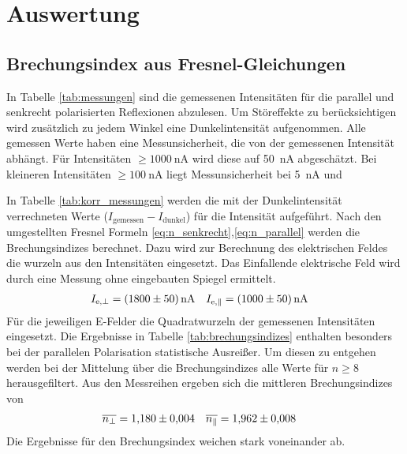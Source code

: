 \section{Auswertung}

\subsection{Brechungsindex aus Fresnel-Gleichungen}



In Tabelle \ref{tab:messungen} sind die gemessenen Intensitäten für die parallel 
und senkrecht polarisierten Reflexionen abzulesen.
Um Störeffekte zu berücksichtigen wird zusätzlich zu jedem Winkel eine Dunkelintensität aufgenommen.
Alle gemessen Werte haben eine Messunsicherheit, die von der gemessenen Intensität abhängt.
Für Intensitäten $\geq \qty{1000}{\nano\ampere}$ wird diese auf \qty{50}{\nano\ampere} abgeschätzt.
Bei kleineren Intensitäten $\geq \qty{100}{\nano\ampere}$ liegt Messunsicherheit bei \qty{5}{\nano\ampere} und 

In Tabelle \ref{tab:korr_messungen} werden die mit der Dunkelintensität verrechneten Werte ($I_\text{gemessen} - I_\text{dunkel}$)
für die Intensität aufgeführt.
Nach den umgestellten Fresnel Formeln \eqref{eq:n_senkrecht},\eqref{eq:n_parallel} werden die Brechungsindizes berechnet.
Dazu wird zur Berechnung des elektrischen Feldes die wurzeln aus den Intensitäten eingesetzt.
Das Einfallende elektrische Feld wird durch eine Messung ohne eingebauten Spiegel ermittelt.
\begin{align}
    I_{\text{e},\perp} &= \qty{1800 \pm 50}{\nano\ampere} & I_{\text{e},\parallel} &= \qty{1000 \pm 50}{\nano\ampere}
\end{align} 
Für die jeweiligen E-Felder die Quadratwurzeln der gemessenen Intensitäten eingesetzt.
Die Ergebnisse in Tabelle \ref{tab:brechungsindizes} enthalten besonders bei der 
parallelen Polarisation statistische Ausreißer. 
Um diesen zu entgehen werden bei der Mittelung über die Brechungsindizes alle Werte für $n \geq 8$ herausgefiltert.
Aus den Messreihen ergeben sich die mittleren Brechungsindizes von 
\begin{align}
    \overline{n_\perp} &= \num{1.180 \pm 0.004} & \overline{n_\parallel} &= \num{1.962 \pm 0.008}
\end{align}
Die Ergebnisse für den Brechungsindex weichen stark voneinander ab.

